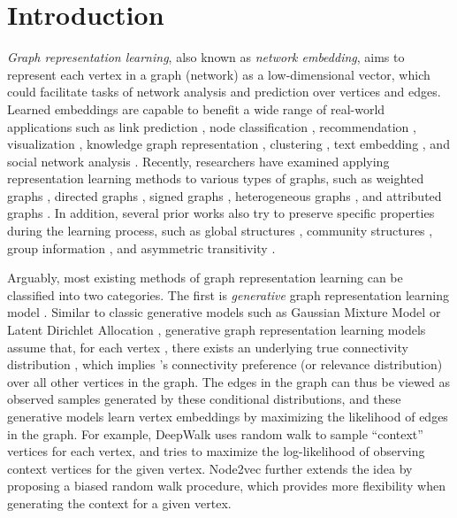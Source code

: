 \documentclass[letterpaper]{article}
\begin{document}
\section{Introduction}
	\textit{Graph representation learning}, also known as \textit{network embedding}, aims to represent each vertex in a graph (network) as a low-dimensional vector, which could facilitate tasks of network analysis and prediction over vertices and edges.
	Learned embeddings are capable to benefit a wide range of real-world applications such as link prediction \cite{gao2011temporal}, node classification \cite{tang2016node}, recommendation \cite{yu2014personalized}, visualization \cite{maaten2008visualizing}, knowledge graph representation \cite{lin2015learning}, clustering \cite{tian2014learning}, text embedding \cite{tang2015pte}, and social network analysis \cite{liu2016aligning}.
	Recently, researchers have examined applying representation learning methods to various types of graphs, such as weighted graphs \cite{grover2016node2vec}, directed graphs \cite{zhou2017scalable}, signed graphs \cite{wang2017signed}, heterogeneous graphs \cite{wang2018shine}, and attributed graphs \cite{huang2017label}.
	In addition, several prior works also try to preserve specific properties during the learning process, such as global structures \cite{wang2016structural}, community structures \cite{wang2017community}, group information \cite{chen2016incorporate}, and asymmetric transitivity \cite{ou2016asymmetric}.
	
	Arguably, most existing methods of graph representation learning can be classified into two categories.
	The first is \textit{generative} graph representation learning model \cite{perozzi2014deepwalk,grover2016node2vec,zhou2017scalable,dong2017metapath2vec,li2017semi}.
	Similar to classic generative models such as Gaussian Mixture Model \cite{lindsay1995mixture} or Latent Dirichlet Allocation \cite{blei2003latent}, generative graph representation learning models assume that, for each vertex , there exists an underlying true connectivity distribution , which implies 's connectivity preference (or relevance distribution) over all other vertices in the graph.
	The edges in the graph can thus be viewed as observed samples generated by these conditional distributions, and these generative models learn vertex embeddings by maximizing the likelihood of edges in the graph.
	For example, DeepWalk \cite{perozzi2014deepwalk} uses random walk to sample ``context'' vertices for each vertex, and tries to maximize the log-likelihood of observing context vertices for the given vertex.
	Node2vec \cite{grover2016node2vec} further extends the idea by proposing a biased random walk procedure, which provides more flexibility when generating the context for a given vertex.
	
\end{document}
